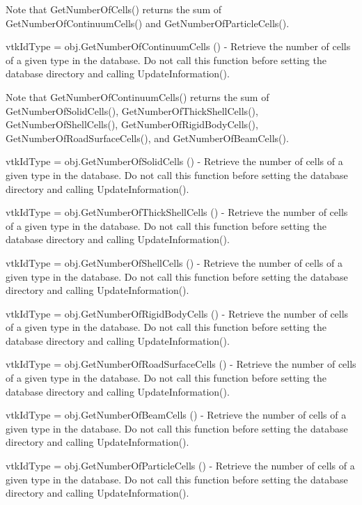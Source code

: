 \begin{DoxyItemize}
Note that Get\-Number\-Of\-Cells() returns the sum of Get\-Number\-Of\-Continuum\-Cells() and Get\-Number\-Of\-Particle\-Cells().  
\item {\ttfamily vtk\-Id\-Type = obj.\-Get\-Number\-Of\-Continuum\-Cells ()} -\/ Retrieve the number of cells of a given type in the database. Do not call this function before setting the database directory and calling Update\-Information().

Note that Get\-Number\-Of\-Continuum\-Cells() returns the sum of Get\-Number\-Of\-Solid\-Cells(), Get\-Number\-Of\-Thick\-Shell\-Cells(), Get\-Number\-Of\-Shell\-Cells(), Get\-Number\-Of\-Rigid\-Body\-Cells(), Get\-Number\-Of\-Road\-Surface\-Cells(), and Get\-Number\-Of\-Beam\-Cells().  
\item {\ttfamily vtk\-Id\-Type = obj.\-Get\-Number\-Of\-Solid\-Cells ()} -\/ Retrieve the number of cells of a given type in the database. Do not call this function before setting the database directory and calling Update\-Information().  
\item {\ttfamily vtk\-Id\-Type = obj.\-Get\-Number\-Of\-Thick\-Shell\-Cells ()} -\/ Retrieve the number of cells of a given type in the database. Do not call this function before setting the database directory and calling Update\-Information().  
\item {\ttfamily vtk\-Id\-Type = obj.\-Get\-Number\-Of\-Shell\-Cells ()} -\/ Retrieve the number of cells of a given type in the database. Do not call this function before setting the database directory and calling Update\-Information().  
\item {\ttfamily vtk\-Id\-Type = obj.\-Get\-Number\-Of\-Rigid\-Body\-Cells ()} -\/ Retrieve the number of cells of a given type in the database. Do not call this function before setting the database directory and calling Update\-Information().  
\item {\ttfamily vtk\-Id\-Type = obj.\-Get\-Number\-Of\-Road\-Surface\-Cells ()} -\/ Retrieve the number of cells of a given type in the database. Do not call this function before setting the database directory and calling Update\-Information().  
\item {\ttfamily vtk\-Id\-Type = obj.\-Get\-Number\-Of\-Beam\-Cells ()} -\/ Retrieve the number of cells of a given type in the database. Do not call this function before setting the database directory and calling Update\-Information().  
\item {\ttfamily vtk\-Id\-Type = obj.\-Get\-Number\-Of\-Particle\-Cells ()} -\/ Retrieve the number of cells of a given type in the database. Do not call this function before setting the database directory and calling Update\-Information().  

\end{DoxyItemize}

